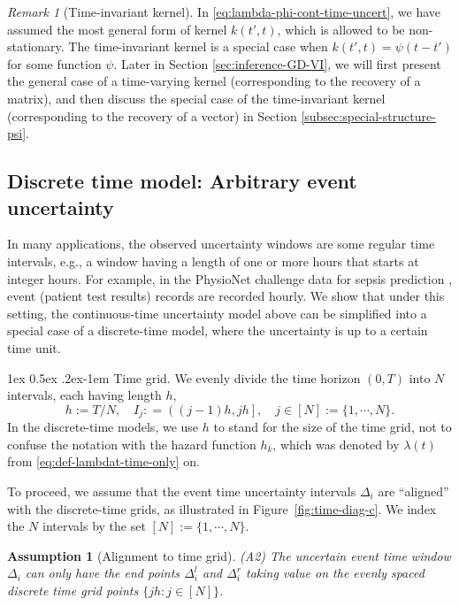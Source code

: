 \documentclass[11pt]{article}
\makeatletter
\newtheorem{assumption}{Assumption}
\theoremstyle{remark}
\newtheorem{remark}{Remark}[section]
\theoremstyle{plain}
\renewcommand{\paragraph}{%
  \@startsection{paragraph}{4}%
  {\z@}{1ex \@plus 0.5ex \@minus .2ex}{-1em}%
  {\normalfont\normalsize\itshape}%
}
\makeatother
\begin{document}
\begin{remark}[Time-invariant kernel]\label{rk:stationary-kernel}
In \eqref{eq:lambda-phi-cont-time-uncert}, we have assumed the most general form of kernel $k(t',t)$, which is allowed to be non-stationary. 
The time-invariant kernel is a special case when $k(t',t) = \psi( t- t' ) $ for some function $\psi$.  
Later in Section \ref{sec:inference-GD-VI}, we will first present the general case of a time-varying kernel (corresponding to the recovery of a matrix), 
and then discuss the special case of the time-invariant kernel (corresponding to the recovery of a vector)
 in Section \ref{subsec:special-structure-psi}.
\end{remark}


\subsection{Discrete time model: Arbitrary event uncertainty}\label{subsec:discrete-general-uncertainty}
In many applications, the observed uncertainty windows are some regular time intervals, e.g., a window having a length of one or more hours 
 that starts at integer hours. 
For example, in the PhysioNet challenge data for sepsis prediction \cite{physionetChallenge}, event (patient test results) records are recorded hourly.
%
We show that under this setting, the continuous-time uncertainty model above can be simplified into a special case of a discrete-time model, 
where the uncertainty is up to a certain time unit.


\paragraph{Time grid.}
We evenly divide the time horizon $(0,T)$ into $N$ intervals, each having length $h$, 
\begin{equation}\label{eq:def-h-time-step}
    h := T/N,
    \quad  I_j: = \left( (j-1) h, j  h \right], 
    \quad j  \in [N] :=\{ 1,\cdots,N \}.
\end{equation} 
In the discrete-time models, we use $h$ to stand for the size of the time grid, not to confuse the notation with the hazard function $h_k$,
which was denoted by $\lambda(t)$ from \eqref{eq:def-lambdat-time-only} on.

To proceed, we assume that the event time uncertainty intervals $\Delta_i$ are ``aligned'' with the discrete-time grids, as illustrated in Figure~\ref{fig:time-diag-c}.
 We index the $N$ intervals by the set $[N]:= \{1, \cdots, N \}$.  
\begin{assumption}[Alignment to time grid]\label{assump:grid}
(A2) The uncertain event time window $\Delta_i$ can only have the end points $\Delta_i^l$ and $\Delta_i^r$ 
taking value on the evenly spaced discrete time grid points $\{ j h: j \in [N]\}$.
\end{assumption}  
\end{document}
